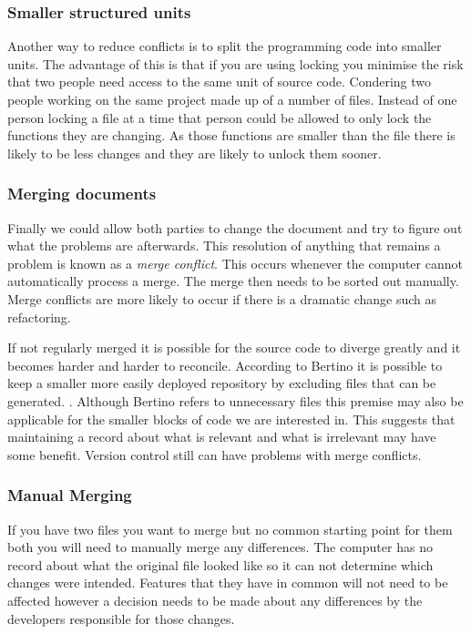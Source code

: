 \subsubsection{Smaller structured units}
Another way to reduce conflicts is to split the programming code into smaller units.  The advantage of this is that if you are using locking you minimise the risk that two people need access to the same unit of source code. Condering two people working on the same project made up of a number of files.  Instead of one person locking a file at a time that person could be allowed to only lock the functions they are changing. As those functions are smaller than the file there is likely to be less changes and they are likely to unlock them sooner.
\subsubsection{Merging documents}
Finally we could allow both parties to change the document and try to figure out what the problems are afterwards.  This resolution of anything that remains a problem is known as a \emph{merge conflict}. This occurs whenever the computer cannot automatically process a merge.  The merge then needs to be sorted out manually. Merge conflicts are more likely to occur if there is a dramatic change such as refactoring.

If not regularly merged it is possible for the source code to diverge greatly and it becomes harder and harder to reconcile.
 According to Bertino it is possible to keep a smaller more easily deployed repository by excluding files that can be generated. \cite{Bertino2012}. Although Bertino refers to unnecessary files this premise may also be applicable for the smaller blocks of code we are interested in. This suggests that maintaining a record about what is relevant and what is irrelevant may have some benefit. Version control still can have problems with merge conflicts. 
 
\subsubsection{Manual Merging}
If you have two files you want to merge but no common starting point for them both you will need to manually merge any differences.  The computer has no record about what the original file looked like so it can not determine which changes were intended.  Features that they have in common will not need to be affected however a decision needs to be made about any differences by the developers responsible for those changes.


